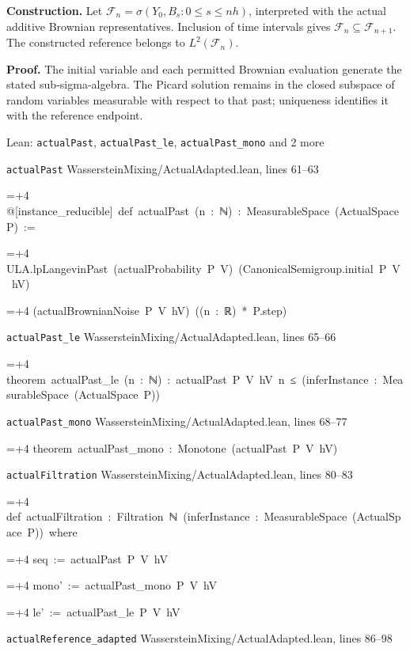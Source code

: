 \documentclass[11pt,a4paper]{report}
\newlength{\leancharwidth}
\newenvironment{leancode}{\par\smallskip\begingroup\ttfamily\footnotesize\raggedright
  \settowidth{\leancharwidth}{M}\setlength{\parskip}{0pt}\setlength{\parindent}{0pt}
  \frenchspacing}{\par\endgroup\smallskip}
\newcommand{\leanline}[2]{\hangindent=\dimexpr#1\leancharwidth+4\leancharwidth\relax
  \hangafter=1\noindent\hspace*{#1\leancharwidth}#2\par}
\newcommand{\leansource}[1]{\par{\footnotesize\color{leanmuted}#1}\par}
\begin{document}
\textbf{Construction.} Let \(\mathcal F_n=\sigma(Y_0,B_s:0\le s\le nh)\), interpreted with the actual additive Brownian representatives. Inclusion of time intervals gives \(\mathcal F_n\subseteq\mathcal F_{n+1}\). The constructed reference belongs to \(L^2(\mathcal F_n)\).



\textbf{Proof.} The initial variable and each permitted Brownian evaluation generate the stated sub-sigma-algebra. The Picard solution remains in the closed subspace of random variables measurable with respect to that past; uniqueness identifies it with the reference endpoint.

\begin{leanbox}{Lean: \texttt{actualPast}, \texttt{actualPast\_\allowbreak{}le}, \texttt{actualPast\_\allowbreak{}mono} and 2 more}
\leansource{\texttt{actualPast} \quad WassersteinMixing/\allowbreak{}ActualAdapted.lean, lines 61–63}
\begin{leancode}
\leanline{0}{@[instance\_reducible]\ def\ actualPast\ (n\ :\ ℕ)\ :\ MeasurableSpace\ (ActualSpace\ P)\ :=}
\leanline{2}{ULA.lpLangevinPast\ (actualProbability\ P\ V)\ (CanonicalSemigroup.initial\ P\ V\ hV)}
\leanline{4}{(actualBrownianNoise\ P\ V\ hV)\ ((n\ :\ ℝ)\ *\ P.step)}
\end{leancode}
\leansource{\texttt{actualPast\_\allowbreak{}le} \quad WassersteinMixing/\allowbreak{}ActualAdapted.lean, lines 65–66}
\begin{leancode}
\leanline{0}{theorem\ actualPast\_le\ (n\ :\ ℕ)\ :\ actualPast\ P\ V\ hV\ n\ ≤\ (inferInstance\ :\ MeasurableSpace\ (ActualSpace\ P))}
\end{leancode}
\leansource{\texttt{actualPast\_\allowbreak{}mono} \quad WassersteinMixing/\allowbreak{}ActualAdapted.lean, lines 68–77}
\begin{leancode}
\leanline{0}{theorem\ actualPast\_mono\ :\ Monotone\ (actualPast\ P\ V\ hV)}
\end{leancode}
\leansource{\texttt{actualFiltration} \quad WassersteinMixing/\allowbreak{}ActualAdapted.lean, lines 80–83}
\begin{leancode}
\leanline{0}{def\ actualFiltration\ :\ Filtration\ ℕ\ (inferInstance\ :\ MeasurableSpace\ (ActualSpace\ P))\ where}
\leanline{2}{seq\ :=\ actualPast\ P\ V\ hV}
\leanline{2}{mono'\ :=\ actualPast\_mono\ P\ V\ hV}
\leanline{2}{le'\ :=\ actualPast\_le\ P\ V\ hV}
\end{leancode}
\leansource{\texttt{actualReference\_\allowbreak{}adapted} \quad WassersteinMixing/\allowbreak{}ActualAdapted.lean, lines 86–98}

\end{leanbox}
\end{document}

